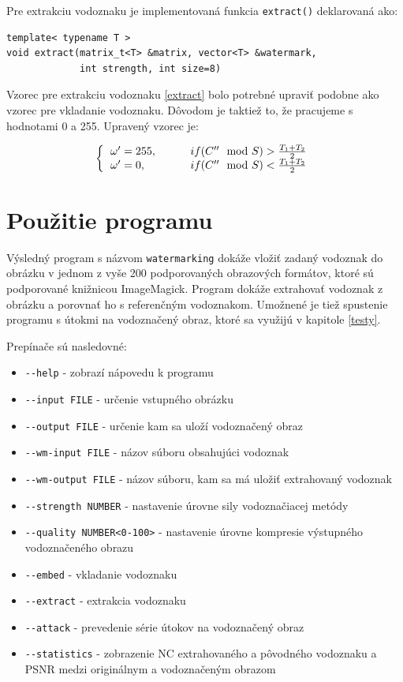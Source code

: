 Pre extrakciu vodoznaku je implementovaná funkcia {\tt extract()} deklarovaná ako:
\begin{lstlisting}
template< typename T >
void extract(matrix_t<T> &matrix, vector<T> &watermark,
             int strength, int size=8)
\end{lstlisting}

Vzorec pre extrakciu vodoznaku \ref{extract} bolo potrebné upraviť podobne ako vzorec pre vkladanie vodoznaku. Dôvodom je taktiež to, že pracujeme s hodnotami 0 a 255. Upravený vzorec je:

\begin{equation} \label{extract-mod}
\left \{
  \begin{tabular}{ll}
  $\omega' = 255,\qquad$ & $if (C''\mod S) > \frac{T_1+T_2}{2}$ \\
  $\omega' = 0,\qquad$  & $if (C''\mod S) < \frac{T_1+T_2}{2}$
  \end{tabular}
\right.
\end{equation}

\section{Použitie programu}
\label{impl:help}
Výsledný program s názvom {\tt watermarking} dokáže vložiť zadaný vodoznak do obrázku v jednom z vyše 200 podporovaných obrazových formátov, ktoré sú podporované knižnicou ImageMagick. Program dokáže extrahovať vodoznak z obrázku a porovnať ho s referenčným vodoznakom. Umožnené je tiež spustenie programu s útokmi na vodoznačený obraz, ktoré sa využijú v kapitole \ref{testy}.

Prepínače sú nasledovné:
\begin{itemize}
\item {\verb|--help|} - zobrazí nápovedu k programu
\item {\verb|--input FILE|} - určenie vstupného obrázku
\item {\verb|--output FILE|} - určenie kam sa uloží vodoznačený obraz
\item {\verb|--wm-input FILE|} - názov súboru obsahujúci vodoznak
\item {\verb|--wm-output FILE|} - názov súboru, kam sa má uložiť extrahovaný vodoznak
\item {\verb|--strength NUMBER|} - nastavenie úrovne sily vodoznačiacej metódy
\item {\verb|--quality NUMBER<0-100>|} - nastavenie úrovne kompresie výstupného vodoznačeného obrazu
\item {\verb|--embed|} - vkladanie vodoznaku
\item {\verb|--extract|} - extrakcia vodoznaku
\item {\verb|--attack|} - prevedenie série útokov na vodoznačený obraz
\item {\verb|--statistics|} - zobrazenie NC extrahovaného a pôvodného vodoznaku a PSNR medzi originálnym a vodoznačeným obrazom 
\end{itemize}

